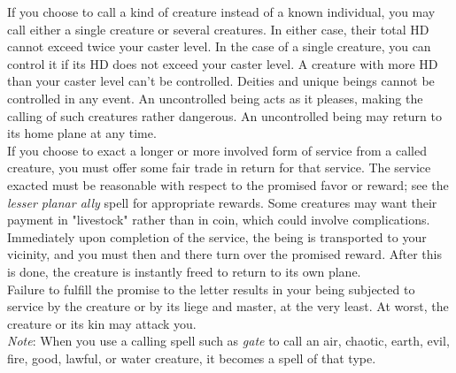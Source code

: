 If you choose to call a kind of creature instead of a known individual, you may call either a single creature or several creatures. In either case, their total HD cannot exceed twice your caster level. In the case of a single creature, you can control it if its HD does not exceed your caster level. A creature with more HD than your caster level can't be controlled. Deities and unique beings cannot be controlled in any event. An uncontrolled being acts as it pleases, making the calling of such creatures rather dangerous. An uncontrolled being may return to its home plane at any time.\\
If you choose to exact a longer or more involved form of service from a called creature, you must offer some fair trade in return for that service. The service exacted must be reasonable with respect to the promised favor or reward; see the \textit{lesser planar ally }spell for appropriate rewards. Some creatures may want their payment in "livestock" rather than in coin, which could involve complications. Immediately upon completion of the service, the being is transported to your vicinity, and you must then and there turn over the promised reward. After this is done, the creature is instantly freed to return to its own plane.\\
Failure to fulfill the promise to the letter results in your being subjected to service by the creature or by its liege and master, at the very least. At worst, the creature or its kin may attack you.\\
\textit{Note}: When you use a calling spell such as \textit{gate }to call an air, chaotic, earth, evil, fire, good, lawful, or water creature, it becomes a spell of that type.\\
